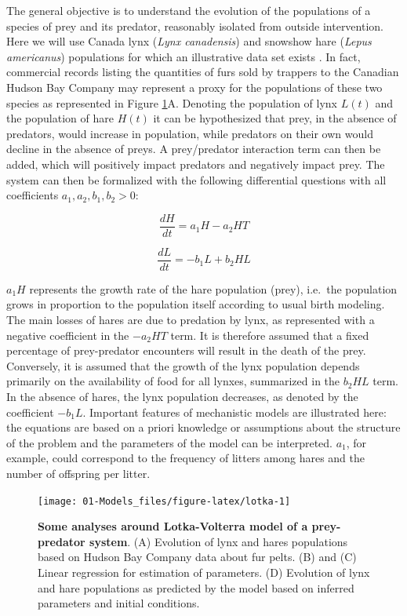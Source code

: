 \documentclass[a4paper,12pt,twoside,onecolumn,openright,final,oldfontcommands]{memoir}
\begin{document}
The general objective is to understand the evolution of the populations
of a species of prey and its predator, reasonably isolated from outside
intervention. Here we will use Canada lynx (\emph{Lynx canadensis}) and
snowshow hare (\emph{Lepus americanus}) populations for which an
illustrative data set exists \citep{hewitt1917conservation}. In fact,
commercial records listing the quantities of furs sold by trappers to
the Canadian Hudson Bay Company may represent a proxy for the
populations of these two species as represented in Figure
\ref{fig:lotka}A. Denoting the population of lynx \(L(t)\) and the
population of hare \(H(t)\) it can be hypothesized that prey, in the
absence of predators, would increase in population, while predators on
their own would decline in the absence of preys. A prey/predator
interaction term can then be added, which will positively impact
predators and negatively impact prey. The system can then be formalized
with the following differential questions with all coefficients
\(a_1, a_2, b_1, b_2 >0\):

\[\dfrac{dH}{dt}=a_1H-a_2HT\]

\[\dfrac{dL}{dt}=-b_1L+b_2HL\]

\(a_1H\) represents the growth rate of the hare population (prey),
i.e.~the population grows in proportion to the population itself
according to usual birth modeling. The main losses of hares are due to
predation by lynx, as represented with a negative coefficient in the
\(-a_2HT\) term. It is therefore assumed that a fixed percentage of
prey-predator encounters will result in the death of the prey.
Conversely, it is assumed that the growth of the lynx population depends
primarily on the availability of food for all lynxes, summarized in the
\(b_2HL\) term. In the absence of hares, the lynx population decreases,
as denoted by the coefficient \(-b_1L\). Important features of
mechanistic models are illustrated here: the equations are based on a
priori knowledge or assumptions about the structure of the problem and
the parameters of the model can be interpreted. \(a_1\), for example,
could correspond to the frequency of litters among hares and the number
of offspring per litter.

\begin{figure}

{\centering \texttt{[image: 01-Models\_files/figure-latex/lotka-1]} 

}

\caption[Some analyses around Lotka-Volterra model of a prey-predator system]{\textbf{Some analyses around Lotka-Volterra model of
a prey-predator system}. (A) Evolution of lynx and hares populations
based on Hudson Bay Company data about fur pelts. (B) and (C) Linear
regression for estimation of parameters. (D) Evolution of lynx and hare
populations as predicted by the model based on inferred parameters and
initial conditions.}\label{fig:lotka}
\end{figure}
\end{document}
